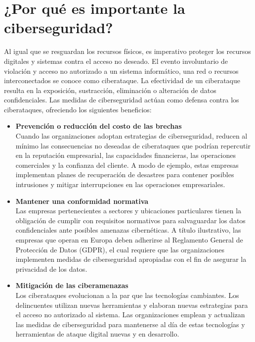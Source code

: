 \documentclass[11pt]{report}
\begin{document}
\section{¿Por qué es importante la ciberseguridad?}
Al igual que se resguardan los recursos físicos, es imperativo proteger los recursos digitales y sistemas contra el acceso no deseado. El evento involuntario de violación y acceso no autorizado a un sistema informático, una red o recursos interconectados se conoce como ciberataque. La efectividad de un ciberataque resulta en la exposición, sustracción, eliminación o alteración de datos confidenciales. Las medidas de ciberseguridad actúan como defensa contra los ciberataques, ofreciendo los siguientes beneficios:
\begin{itemize}
  \item \textbf{Prevención o reducción del costo de las brechas} \\
  Cuando las organizaciones adoptan estrategias de ciberseguridad, reducen al mínimo las consecuencias no deseadas de ciberataques que podrían repercutir en la reputación empresarial, las capacidades financieras, las operaciones comerciales y la confianza del cliente. A modo de ejemplo, estas empresas implementan planes de recuperación de desastres para contener posibles intrusiones y mitigar interrupciones en las operaciones empresariales.

  \item \textbf{Mantener una conformidad normativa} \\
  Las empresas pertenecientes a sectores y ubicaciones particulares tienen la obligación de cumplir con requisitos normativos para salvaguardar los datos confidenciales ante posibles amenazas cibernéticas. A título ilustrativo, las empresas que operan en Europa deben adherirse al Reglamento General de Protección de Datos (GDPR), el cual requiere que las organizaciones implementen medidas de ciberseguridad apropiadas con el fin de asegurar la privacidad de los datos.
  
  \item \textbf{Mitigación de las ciberamenazas} \\
  Los ciberataques evolucionan a la par que las tecnologías cambiantes. Los delincuentes utilizan nuevas herramientas y elaboran nuevas estrategias para el acceso  no autorizado al sistema. Las organizaciones emplean y actualizan las medidas de ciberseguridad para mantenerse al día de estas tecnologías y herramientas de ataque digital nuevas y en desarrollo. 
\end{itemize}
\end{document}
